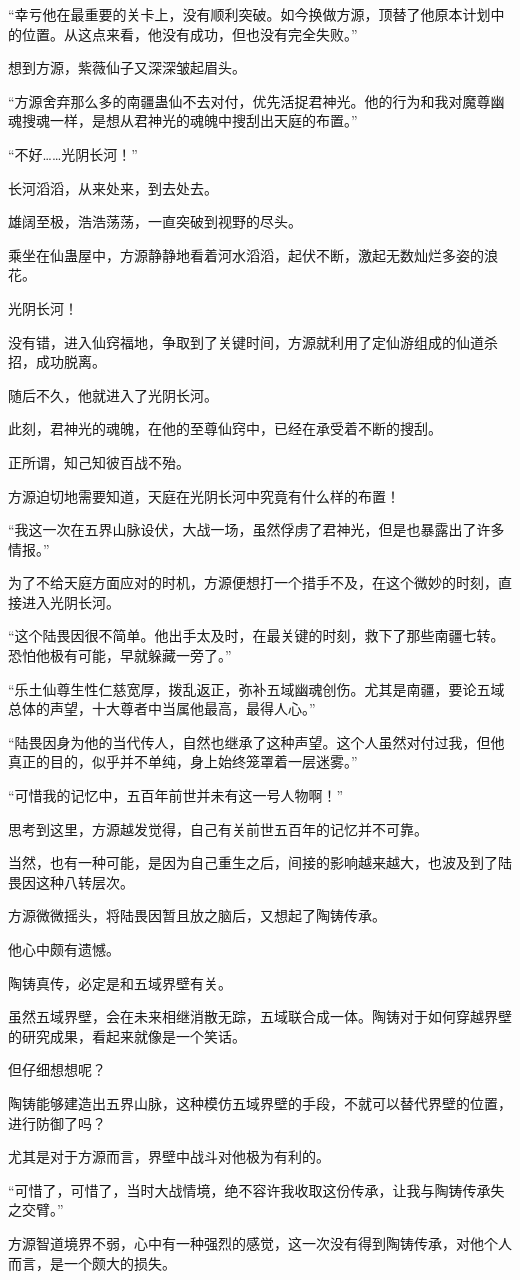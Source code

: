 \begin{this_body}
“幸亏他在最重要的关卡上，没有顺利突破。如今换做方源，顶替了他原本计划中的位置。从这点来看，他没有成功，但也没有完全失败。”

想到方源，紫薇仙子又深深皱起眉头。

“方源舍弃那么多的南疆蛊仙不去对付，优先活捉君神光。他的行为和我对魔尊幽魂搜魂一样，是想从君神光的魂魄中搜刮出天庭的布置。”

“不好……光阴长河！”

长河滔滔，从来处来，到去处去。

雄阔至极，浩浩荡荡，一直突破到视野的尽头。

乘坐在仙蛊屋中，方源静静地看着河水滔滔，起伏不断，激起无数灿烂多姿的浪花。

光阴长河！

没有错，进入仙窍福地，争取到了关键时间，方源就利用了定仙游组成的仙道杀招，成功脱离。

随后不久，他就进入了光阴长河。

此刻，君神光的魂魄，在他的至尊仙窍中，已经在承受着不断的搜刮。

正所谓，知己知彼百战不殆。

方源迫切地需要知道，天庭在光阴长河中究竟有什么样的布置！

“我这一次在五界山脉设伏，大战一场，虽然俘虏了君神光，但是也暴露出了许多情报。”

为了不给天庭方面应对的时机，方源便想打一个措手不及，在这个微妙的时刻，直接进入光阴长河。

“这个陆畏因很不简单。他出手太及时，在最关键的时刻，救下了那些南疆七转。恐怕他极有可能，早就躲藏一旁了。”

“乐土仙尊生性仁慈宽厚，拨乱返正，弥补五域幽魂创伤。尤其是南疆，要论五域总体的声望，十大尊者中当属他最高，最得人心。”

“陆畏因身为他的当代传人，自然也继承了这种声望。这个人虽然对付过我，但他真正的目的，似乎并不单纯，身上始终笼罩着一层迷雾。”

“可惜我的记忆中，五百年前世并未有这一号人物啊！”

思考到这里，方源越发觉得，自己有关前世五百年的记忆并不可靠。

当然，也有一种可能，是因为自己重生之后，间接的影响越来越大，也波及到了陆畏因这种八转层次。

方源微微摇头，将陆畏因暂且放之脑后，又想起了陶铸传承。

他心中颇有遗憾。

陶铸真传，必定是和五域界壁有关。

虽然五域界壁，会在未来相继消散无踪，五域联合成一体。陶铸对于如何穿越界壁的研究成果，看起来就像是一个笑话。

但仔细想想呢？

陶铸能够建造出五界山脉，这种模仿五域界壁的手段，不就可以替代界壁的位置，进行防御了吗？

尤其是对于方源而言，界壁中战斗对他极为有利的。

“可惜了，可惜了，当时大战情境，绝不容许我收取这份传承，让我与陶铸传承失之交臂。”

方源智道境界不弱，心中有一种强烈的感觉，这一次没有得到陶铸传承，对他个人而言，是一个颇大的损失。

\end{this_body}

